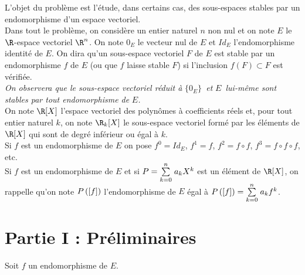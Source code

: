 \documentclass[11pt]{article}%
\begin{document}
\noindent L'objet du problème est l'étude, dans certains cas, des
sous-espaces stables par un endomorphisme d'un espace vectoriel.\\
Dans tout le problème, on considère un entier naturel $n$ non nul et on
note 
$E$ le $\R$-espace vectoriel $\R^{n}$. On note $0_{E}$ le
vecteur nul de $E$ et $Id_{E}$ l'endomorphisme identité de $E$. On dira
qu'un sous-espace vectoriel $F$ de $E$ est stable par un endomorphisme
$f$
de $E$ (ou que $f$ laisse stable $F$) si l'inclusion $f(F)\subset F$
est vérifiée.\\
\textit{On observera que le sous-espace vectoriel réduit à
}$\{0_{E}\}$\textit{\ et }$E$\textit{\ lui-même sont stables par tout
endomorphisme de }$E$\textit{. }\\
On note $\R[X]$ l'espace vectoriel des polynômes à coefficients réels
et, pour tout entier naturel $k$, on note $\R_{k}[X]$ le
sous-espace vectoriel formé par les éléments de $\R[X]$ qui sont de
degré inférieur ou égal à $k$.\\
Si $f$ est un endomorphisme de $E$ on pose $f^{0} = Id_{E}$, $f^{1} =
f$, $f^{2} = f\circ f$, $f^{3} = f\circ f\circ f$, etc.\\
Si $f$ est un endomorphisme de $E$ et si $P = {\textstyle\sum\limits_{k = 0}^{n}}\hspace{.1cm}a_{k}X^{k}$
est un élément de $\R[X]$, on rappelle qu'on note
$P\left(\left[ {f} \right]\right)$
l'endomorphisme de $E$ égal à $P\left(\left[ {f} \right]\right) = {\textstyle\sum\limits_{k =
0}^{n}}\hspace{.1cm}a_{k}f^{k}$.

\section*{Partie I : {Préliminaires}}

Soit $f$ un endomorphisme de $E$.
\end{document}
